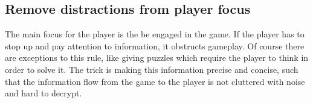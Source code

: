 \subsection{Remove distractions from player focus}
The main focus for the player is the be engaged in the game. 
If the player has to stop up and pay attention to information, it obstructs gameplay. 
Of course there are exceptions to this rule, like giving puzzles which require the player to think in order to solve it. 
The trick is making this information precise and concise, such that the information flow from the game to the player is not cluttered with noise and hard to decrypt.


